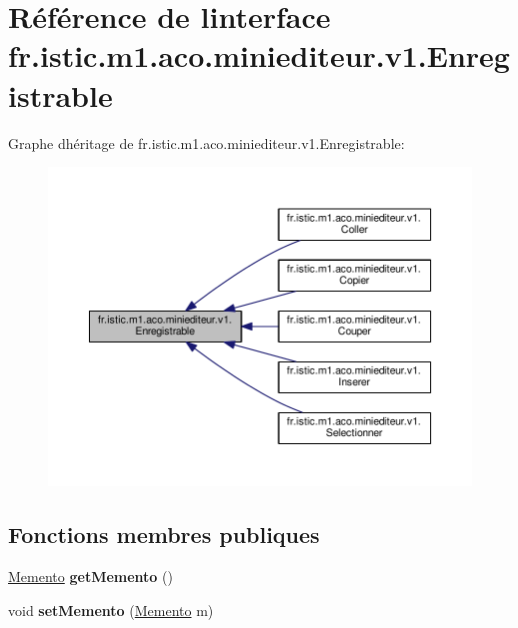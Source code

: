 \hypertarget{interfacefr_1_1istic_1_1m1_1_1aco_1_1miniediteur_1_1v1_1_1Enregistrable}{}\section{Référence de l\textquotesingle{}interface fr.\+istic.\+m1.\+aco.\+miniediteur.\+v1.\+Enregistrable}
\label{interfacefr_1_1istic_1_1m1_1_1aco_1_1miniediteur_1_1v1_1_1Enregistrable}


Graphe d\textquotesingle{}héritage de fr.\+istic.\+m1.\+aco.\+miniediteur.\+v1.\+Enregistrable\+:
\nopagebreak
\begin{figure}[H]
\begin{center}
\leavevmode
\includegraphics[width=350pt]{interfacefr_1_1istic_1_1m1_1_1aco_1_1miniediteur_1_1v1_1_1Enregistrable__inherit__graph}
\end{center}
\end{figure}
\subsection*{Fonctions membres publiques}
\begin{DoxyCompactItemize}
\item 
\mbox{\label{interfacefr_1_1istic_1_1m1_1_1aco_1_1miniediteur_1_1v1_1_1Enregistrable_aadf173c765d103d3924bbb688c45abb6}} 
\hyperlink{interfacefr_1_1istic_1_1m1_1_1aco_1_1miniediteur_1_1v1_1_1Memento}{Memento} {\bfseries get\+Memento} ()
\item 
\mbox{\label{interfacefr_1_1istic_1_1m1_1_1aco_1_1miniediteur_1_1v1_1_1Enregistrable_a949bb6784743800c2d743def265f41b1}} 
void {\bfseries set\+Memento} (\hyperlink{interfacefr_1_1istic_1_1m1_1_1aco_1_1miniediteur_1_1v1_1_1Memento}{Memento} m)
\end{DoxyCompactItemize}


